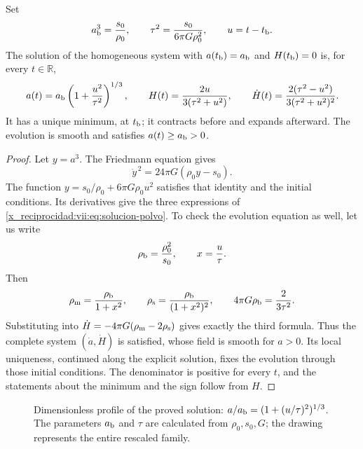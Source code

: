 \begin{theorem}
\label{x_reciprocidad:vii:thm:rebote-polvo}
Set
\[
 a_{\rm b}^3=\frac{s_0}{\rho_0},\qquad
 \tau^2=\frac{s_0}{6\pi G\rho_0^2},\qquad u=t-t_{\rm b}.
\]
The solution of the homogeneous system with
\(a(t_{\rm b})=a_{\rm b}\) and \(H(t_{\rm b})=0\) is, for every
\(t\in\mathbb R\),
\begin{equation}
 a(t)=a_{\rm b}\left(1+\frac{u^2}{\tau^2}\right)^{1/3},
 \qquad H(t)=\frac{2u}{3(\tau^2+u^2)},\qquad
 \dot H(t)=\frac{2(\tau^2-u^2)}{3(\tau^2+u^2)^2}.
 \label{x_reciprocidad:vii:eq:solucion-polvo}
\end{equation}
It has a unique minimum, at \(t_{\rm b}\); it contracts before and
expands afterward. The evolution is smooth and satisfies
\(a(t)\geq a_{\rm b}>0\).
\end{theorem}
\begin{proof}
Let \(y=a^3\). The Friedmann equation gives
\[
 \dot y^{\,2}=24\pi G(\rho_0y-s_0).
\]
The function \(y=s_0/\rho_0+6\pi G\rho_0u^2\) satisfies that
identity and the initial conditions. Its derivatives give the
three expressions of \eqref{x_reciprocidad:vii:eq:solucion-polvo}. To check
the evolution equation as well, let us write
\[
 \rho_{\rm b}=\frac{\rho_0^2}{s_0},\qquad
 x=\frac{u}{\tau}.
\]
Then
\[
 \rho_{\rm m}=\frac{\rho_{\rm b}}{1+x^2},\qquad
 \rho_{\rm s}=\frac{\rho_{\rm b}}{(1+x^2)^2},\qquad
 4\pi G\rho_{\rm b}=\frac{2}{3\tau^2}.
\]
Substituting into \(\dot H=-4\pi G(\rho_{\rm m}-2\rho_{\rm s})\)
gives exactly the third formula. Thus the complete
system \((\dot a,\dot H)\) is satisfied, whose field is smooth
for \(a>0\). Its local uniqueness, continued along the explicit
solution, fixes the evolution through those initial conditions.
The denominator is positive for every \(t\), and the statements
about the minimum and the sign follow from \(H\).
\end{proof}

\begin{figure}[htbp]
\centering
{}
\caption{Dimensionless profile of the proved solution:
\(a/a_{\rm b}=(1+(u/\tau)^2)^{1/3}\).
The parameters \(a_{\rm b}\) and \(\tau\) are calculated from
\(\rho_0,s_0,G\); the drawing represents the entire rescaled family.}
\label{x_reciprocidad:vii:fig:rebote-polvo}
\end{figure}

